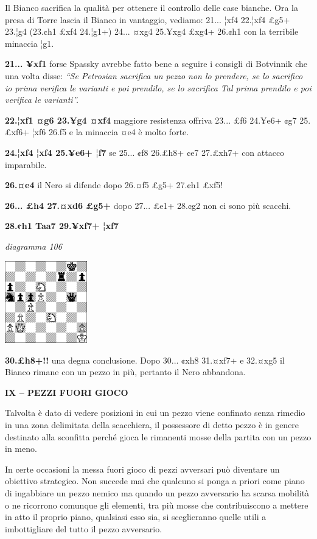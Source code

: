 \documentclass[
]{article}
\begin{document}
Il Bianco sacrifica la qualità per ottenere il controllo delle case
bianche. Ora la presa di Torre lascia il Bianco in vantaggio, vediamo:
21... ¦xf4 22.¦xf4 £g5+ 23.¦g4 (23.¢h1 £xf4 24.¦g1+) 24... ¤xg4 25.¥xg4
£xg4+ 26.¢h1 con la terribile minaccia ¦g1.

\textbf{21... ¥xf1} forse Spassky avrebbe fatto bene a seguire i
consigli di Botvinnik che una volta disse: \emph{``Se Petrosian
sacrifica un pezzo non lo prendere, se lo sacrifico io prima verifica le
varianti e poi prendilo, se lo sacrifica Tal prima prendilo e poi
verifica le varianti''.}

\textbf{22.¦xf1 ¤g6 23.¥g4 ¤xf4} maggiore resistenza offriva 23... £f6
24.¥e6+ ¢g7 25.£xf6+ ¦xf6 26.f5 e la minaccia ¤e4 è molto forte.

\textbf{24.¦xf4 ¦xf4 25.¥e6+ ¦f7} se 25... ¢f8 26.£h8+ ¢e7 27.£xh7+ con
attacco imparabile.

\textbf{26.¤e4} il Nero si difende dopo 26.¤f5 £g5+ 27.¢h1 £xf5!

\textbf{26... £h4 27.¤xd6 £g5+} dopo 27... £e1+ 28.¢g2 non ci sono più
scacchi.

\textbf{28.¢h1 Taa7 29.¥xf7+ ¦xf7}

\emph{diagramma 106}

\includegraphics[width=1.40139in,height=1.40139in]{vertopal_109f12be458a423d8f3cc838880eaea2/media/image106.png}

\textbf{30.£h8+!!} una degna conclusione. Dopo 30... ¢xh8 31.¤xf7+ e
32.¤xg5 il Bianco rimane con un pezzo in più, pertanto il Nero
abbandona.

\textbf{IX -- PEZZI FUORI GIOCO}

Talvolta è dato di vedere posizioni in cui un pezzo viene confinato
senza rimedio in una zona delimitata della scacchiera, il possessore di
detto pezzo è in genere destinato alla sconfitta perché gioca le
rimanenti mosse della partita con un pezzo in meno.

In certe occasioni la messa fuori gioco di pezzi avversari può diventare
un obiettivo strategico. Non succede mai che qualcuno si ponga a priori
come piano di ingabbiare un pezzo nemico ma quando un pezzo avversario
ha scarsa mobilità o ne ricorrono comunque gli elementi, tra più mosse
che contribuiscono a mettere in atto il proprio piano, qualsiasi esso
sia, si sceglieranno quelle utili a imbottigliare del tutto il pezzo
avversario.
\end{document}
